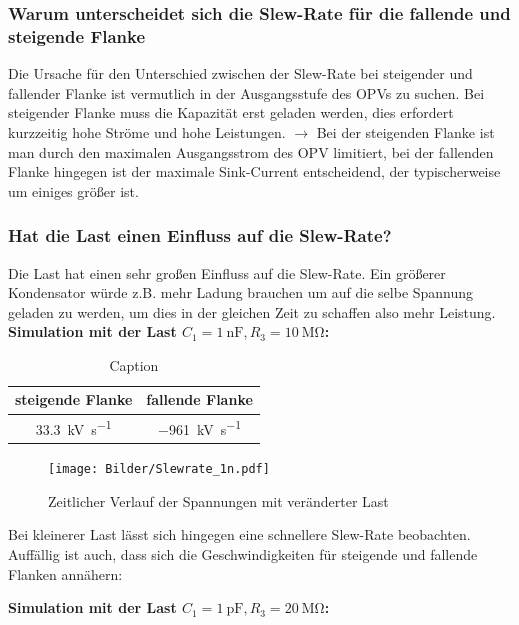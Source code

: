 \subsubsection{Warum unterscheidet sich die Slew-Rate für die fallende und steigende Flanke}

Die Ursache für den Unterschied zwischen der Slew-Rate bei steigender und fallender Flanke ist vermutlich in der Ausgangsstufe des OPVs zu suchen. Bei steigender Flanke muss die Kapazität erst geladen werden, dies erfordert kurzzeitig hohe Ströme und hohe Leistungen. $\rightarrow$ Bei der steigenden Flanke ist man durch den maximalen Ausgangsstrom des OPV limitiert, bei der fallenden Flanke hingegen ist der maximale Sink-Current entscheidend, der typischerweise um einiges größer ist.

\subsubsection{Hat die Last einen Einfluss auf die Slew-Rate?}

Die Last hat einen sehr großen Einfluss auf die Slew-Rate. Ein größerer Kondensator würde z.B. mehr Ladung brauchen um auf die selbe Spannung geladen zu werden, um dies in der gleichen Zeit zu schaffen also mehr Leistung.\\

\textbf{Simulation mit der Last $C_1 = \SI{1}{\nano \farad}, R_3 = \SI{10}{\mega \ohm}$:}

\begin{table}[H]
    \centering
    \begin{tabular}{|c|c|}
    \hline
         steigende Flanke & fallende Flanke  \\ \hline
         \SI{33.3}{\kilo \volt \per \second} & \SI{-961}{\kilo \volt \per \second} \\ \hline
    \end{tabular}
    \caption{Caption}
    \label{tab:my_label}
\end{table}

\begin{figure}[H]
    \centering
    \texttt{[image: Bilder/Slewrate\_1n.pdf]}
    \caption{Zeitlicher Verlauf der Spannungen mit veränderter Last}
\end{figure}

Bei kleinerer Last lässt sich hingegen eine schnellere Slew-Rate beobachten. Auffällig ist auch, dass sich die Geschwindigkeiten für steigende und fallende Flanken annähern:

\textbf{Simulation mit der Last $C_1 = \SI{1}{\pico \farad}, R_3 = \SI{20}{\mega \ohm}$:}

